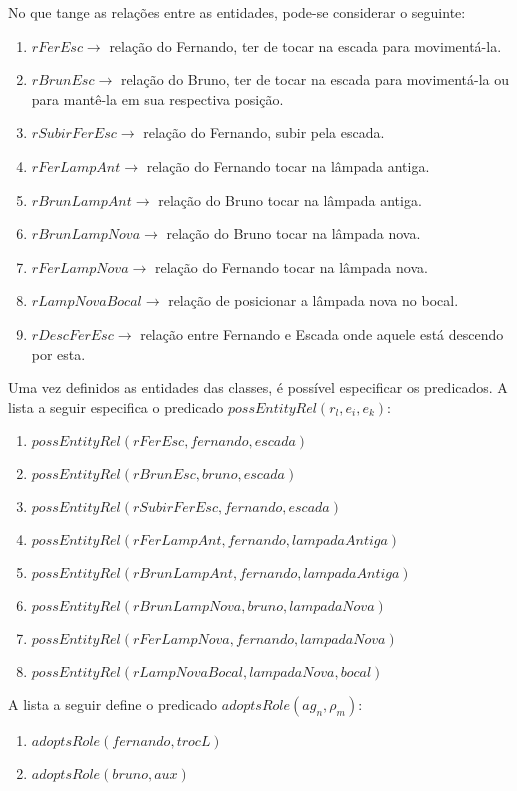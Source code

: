 No que tange as relações entre as entidades, pode-se considerar o seguinte: 

\begin{enumerate}
	\item $rFerEsc \to$ relação do Fernando, ter de tocar na escada para movimentá-la. 
	\item $rBrunEsc \to$ relação do Bruno, ter de tocar na escada para movimentá-la ou para mantê-la em sua respectiva posição.
	\item $rSubirFerEsc \to$ relação do Fernando, subir pela escada.
	\item $rFerLampAnt \to$ relação do Fernando tocar na lâmpada antiga. 
	\item $rBrunLampAnt \to$ relação do Bruno tocar na lâmpada antiga.
	\item $rBrunLampNova \to$ relação do Bruno tocar na lâmpada nova.
	\item $rFerLampNova \to$ relação do Fernando tocar na lâmpada nova.
	\item $rLampNovaBocal \to$  relação de posicionar a lâmpada nova no bocal. 	
	\item $rDescFerEsc \to$ relação entre Fernando e Escada onde aquele está descendo por esta.
\end{enumerate}


Uma vez definidos as entidades das classes, é possível especificar os predicados. A lista a seguir especifica o predicado $possEntityRel(r_l,e_i,e_k)$:

\begin{enumerate}
	\item $possEntityRel(rFerEsc,fernando,escada)$
	\item $possEntityRel(rBrunEsc,bruno,escada)$
	\item $possEntityRel(rSubirFerEsc,fernando,escada)$
	\item $possEntityRel(rFerLampAnt,fernando,lampadaAntiga)$
	\item $possEntityRel(rBrunLampAnt,fernando,lampadaAntiga)$
	\item $possEntityRel(rBrunLampNova,bruno,lampadaNova)$
	\item $possEntityRel(rFerLampNova,fernando,lampadaNova)$
	\item $possEntityRel(rLampNovaBocal,lampadaNova,bocal)$
\end{enumerate}

A lista a seguir define o predicado $adoptsRole(ag_n,\rho_m)$:

\begin{enumerate}
	\item $adoptsRole(fernando,trocL)$
	\item $adoptsRole(bruno,aux)$
\end{enumerate}

